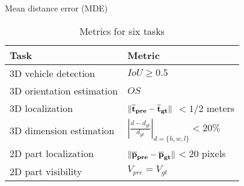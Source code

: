 Mean distance error (MDE) \tbd

\renewcommand{\arraystretch}{1.5}
\begin{table}[ht]
	\centering
	\caption{Metrics for six tasks}
	\label{my-label}
	\begin{tabular}{|m{6cm}|m{6cm}|}
		\hline
		Task                    & Metric         \\ \hline
		3D vehicle detection    & $IoU \geq 0.5$ \\  \hline
		3D orientation estimation  & $OS$     \\ \hline
		3D localization         &$\bf \lVert \overline t_{pre} - \overline t_{gt} \rVert$ $< 1 / 2$ meters   \\ \hline
		3D dimension estimation & $\left | \frac{d-d_{gt}}{d_{gt}} \right | _{d =\{h,w,l\}}<  20\%$           \\ \hline
		2D part localization    & $ \bf \lVert \overline p_{pre} - \overline p_{gt} \rVert $$<  20$ pixels      \\ \hline
		2D part visibility      &     $V_{pre} = V_{gt}$         \\ \hline
	\end{tabular}
\end{table}
